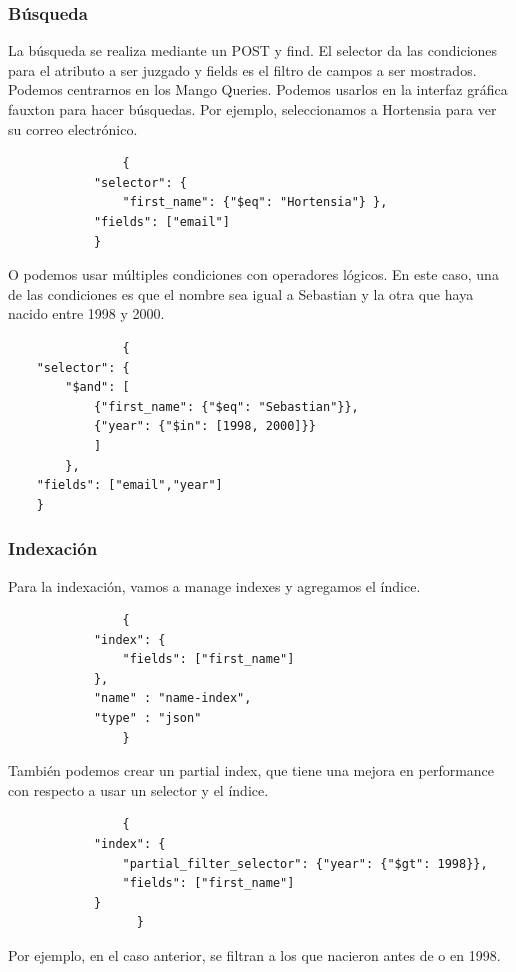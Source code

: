 \documentclass{article}
\begin{document}
\begin{itemize}
            \subsubsection{Búsqueda}
            La búsqueda se realiza mediante un POST y find. El selector da las condiciones para el atributo a ser juzgado y fields es el filtro de campos a ser mostrados.
            Podemos centrarnos en los Mango Queries. Podemos usarlos en la interfaz gráfica fauxton para hacer búsquedas.
            Por ejemplo, seleccionamos a Hortensia para ver su correo electrónico.
            \begin{lstlisting}
                {
            "selector": {
                "first_name": {"$eq": "Hortensia"} }, 
            "fields": ["email"]
            }
            \end{lstlisting}
            O podemos usar múltiples condiciones con operadores lógicos.
            En este caso, una de las condiciones es que el nombre sea igual a Sebastian y la otra que haya nacido entre 1998 y 2000. 
            \begin{lstlisting}
                {
    "selector": {
        "$and": [
            {"first_name": {"$eq": "Sebastian"}},
            {"year": {"$in": [1998, 2000]}}
            ]
        },
    "fields": ["email","year"]
    }
            \end{lstlisting}

            \subsubsection{Indexación}
            Para la indexación, vamos a manage indexes y agregamos el índice. 
            \begin{lstlisting}
                {
            "index": {
                "fields": ["first_name"]
            },
            "name" : "name-index",
            "type" : "json"
                }
            \end{lstlisting}
            También podemos crear un partial index, que tiene una mejora en performance con respecto a usar un selector y el índice.
            \begin{lstlisting}
                {
            "index": {
                "partial_filter_selector": {"year": {"$gt": 1998}},
                "fields": ["first_name"]
            }
                  } 
            \end{lstlisting} 
            Por ejemplo, en el caso anterior, se filtran a los que nacieron antes de o en 1998.

\end{itemize}
\end{document}
